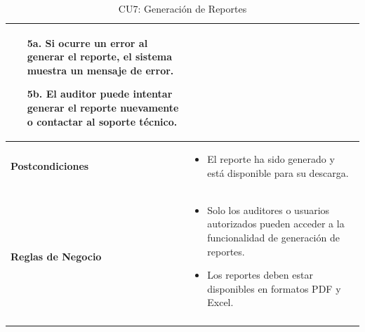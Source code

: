 \documentclass{article}
\begin{document}
\begin{longtable}{|l|p{10cm}|}
\begin{itemize}
    \begin{enumerate}
        \item[5a.] Si ocurre un error al generar el reporte, el sistema muestra un mensaje de error.
        \item[5b.] El auditor puede intentar generar el reporte nuevamente o contactar al soporte técnico.
    \end{enumerate}
\end{itemize} \\ \hline
\textbf{Postcondiciones} & 
\begin{itemize}
    \item El reporte ha sido generado y está disponible para su descarga.
\end{itemize} \\ \hline
\textbf{Reglas de Negocio} & 
\begin{itemize}
    \item Solo los auditores o usuarios autorizados pueden acceder a la funcionalidad de generación de reportes.
    \item Los reportes deben estar disponibles en formatos PDF y Excel.
\end{itemize} \\ \hline
\caption{CU7: Generación de Reportes}
\end{longtable}

\newpage
\end{document}
